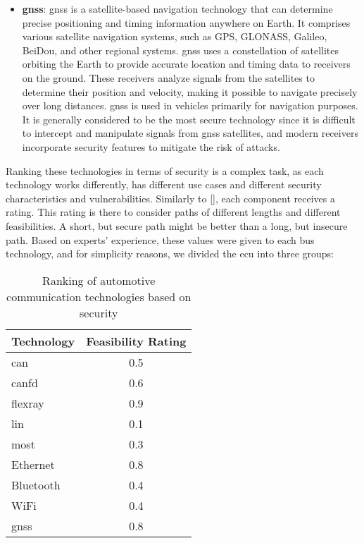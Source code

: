 \begin{itemize}
    \item \textbf{\acrshort{gnss}}: \acrshort{gnss} is a satellite-based navigation technology that can determine precise positioning and timing information anywhere on Earth. 
    It comprises various satellite navigation systems, such as GPS, GLONASS, Galileo, BeiDou, and other regional systems.
    \acrshort{gnss} uses a constellation of satellites orbiting the Earth to provide accurate location and timing data to receivers on the ground. 
    These receivers analyze signals from the satellites to determine their position and velocity, making it possible to navigate precisely over long distances.
    \acrshort{gnss} is used in vehicles primarily for navigation purposes.
    It is generally considered to be the most secure technology since it is difficult to intercept and manipulate signals from \acrshort{gnss} satellites, 
    and modern receivers incorporate security features to mitigate the risk of attacks.
\end{itemize}
    
Ranking these technologies in terms of security is a complex task, as each technology works differently,
has different use cases and different security characteristics and vulnerabilities.
Similarly to [\cite{threat_surf}], each component receives a rating.
This rating is there to consider paths of different lengths and different feasibilities.
A short, but secure path might be better than a long, but insecure path.
Based on experts' experience, these values were given to each bus technology, and for 
simplicity reasons, we divided the \acrshort{ecu} into three groups:

\begin{table}[h]
    \label{table:bus_rating}
    \centering
    \begin{tabular}{|l|c|}
    \hline
    \textbf{Technology} & \textbf{Feasibility Rating} \\
    \hline
    \acrshort{can} & 0.5 \\
    \acrshort{canfd} & 0.6 \\
    \acrshort{flexray} & 0.9 \\
    \acrshort{lin} & 0.1 \\
    \acrshort{most} & 0.3 \\
    Ethernet & 0.8 \\
    Bluetooth & 0.4 \\
    WiFi & 0.4 \\
    \acrshort{gnss} & 0.8 \\
    \hline
    \end{tabular}
    \caption{Ranking of automotive communication technologies based on security}
\end{table}

